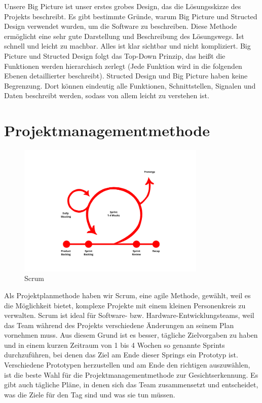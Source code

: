 Unsere Big Picture ist unser erstes grobes Design, das die Lösungsskizze des Projekts beschreibt. Es gibt bestimmte Gründe, warum Big Picture und Structed Design verwendet wurden, um die Software zu beschreiben. Diese Methode ermöglicht eine sehr gute Darstellung und Beschreibung des Lösungswegs. Ist schnell und leicht zu machbar. Alles ist klar sichtbar und nicht kompliziert. Big Picture und Structed Design folgt das Top-Down Prinzip, das heißt die Funktionen werden hierarchisch zerlegt (Jede Funktion wird in die folgenden Ebenen detaillierter beschreibt). Structed Design und Big Picture haben keine Begrenzung. Dort können eindeutig alle Funktionen, Schnittstellen, Signalen und Daten beschreibt werden, sodass von allem leicht zu verstehen ist. 






\section{Projektmanagementmethode}

\begin{figure}[h]
	\includegraphics[width=0.8\textwidth]{./figures/scrum.jpg}
	\caption{Scrum}
\end{figure}

Als Projektplanmethode haben wir Scrum, eine agile Methode, gewählt, weil es die Möglichkeit bietet, komplexe Projekte mit einem kleinen Personenkreis zu verwalten. Scrum ist ideal für Software- bzw. Hardware-Entwicklungsteams, weil das Team während des Projekts verschiedene Änderungen an seinem Plan vornehmen muss. Aus diesem Grund ist es besser, tägliche Zielvorgaben zu haben und in einem kurzen Zeitraum von 1 bis 4 Wochen so genannte Sprints durchzuführen, bei denen das Ziel am Ende dieser Springs ein Prototyp ist. Verschiedene Prototypen herzustellen und am Ende den richtigen auszuwählen, ist die beste Wahl für die Projektmanagementmethode zur Gesichtserkennung. Es gibt auch tägliche Pläne, in denen sich das Team zusammensetzt und entscheidet, was die Ziele für den Tag sind und was sie tun müssen. 




